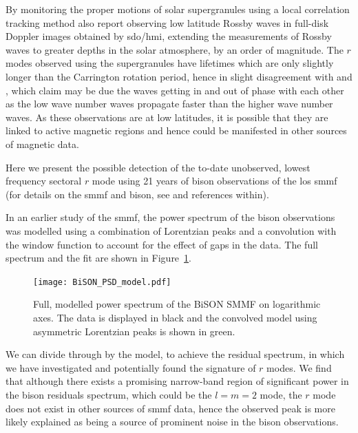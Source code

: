 By monitoring the proper motions of solar supergranules using a local correlation tracking method \citet{hathaway_hydrodynamic_2020} also report observing low latitude Rossby waves in full-disk Doppler images obtained by \gls{sdo/hmi}, extending the measurements of Rossby waves to greater depths in the solar atmosphere, by an order of magnitude. The $r$ modes observed using the supergranules have lifetimes which are only slightly longer than the Carrington rotation period, hence in slight disagreement with \citet{loptien_global-scale_2018} and \citet{liang_time-distance_2019}, which \citet{hathaway_hydrodynamic_2020} claim may be due the waves getting in and out of phase with each other as the low wave number waves propagate faster than the higher wave number waves. As these observations are at low latitudes, it is possible that they are linked to active magnetic regions and hence could be manifested in other sources of magnetic data.

Here we present the possible detection of the to-date unobserved, lowest frequency sectoral $r$ mode using 21 years of \gls{bison} observations of the \gls{los} \gls{smmf} (for details on the \gls{smmf} and \gls{bison}, see \citet{chaplin_studies_2003} and references within).

In an earlier study of the \gls{smmf}, the power spectrum of the \gls{bison} observations was modelled using a combination of Lorentzian peaks and a convolution with the window function to account for the effect of gaps in the data. The full spectrum and the fit are shown in Figure~\ref{fig:BiSON_PSD}.



\begin{figure}[ht!]
	\centering
	\texttt{[image: BiSON\_PSD\_model.pdf]}
	\caption{Full, modelled power spectrum of the BiSON SMMF on logarithmic axes. The data is displayed in black and the convolved model using asymmetric Lorentzian peaks is shown in green.}
	\label{fig:BiSON_PSD}
\end{figure}

We can divide through by the model, to achieve the residual spectrum, in which we have investigated and potentially found the signature of $r$ modes. We find that although there exists a promising narrow-band region of significant power in the \gls{bison} residuals spectrum, which could be the $l=m=2$ mode, the $r$ mode does not exist in other sources of \gls{smmf} data, hence the observed peak is more likely explained as being a source of prominent noise in the \gls{bison} observations.




